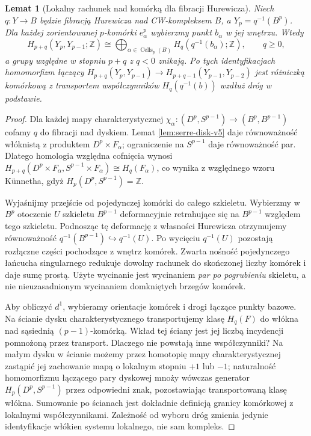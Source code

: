 \documentclass[11pt,a4paper,oneside]{report}
\newcommand{\Z}{\mathbb{Z}}
\theoremstyle{plain}
\newtheorem{lemat}[twierdzenie]{Lemat}
\theoremstyle{definition}
\theoremstyle{remark}
\begin{document}
\begin{lemat}[Lokalny rachunek nad komórką dla fibracji Hurewicza]
\label{lem:serre-cell-hurewicz-v6}
Niech $q:Y\to B$ będzie fibracją Hurewicza nad CW-kompleksem
$B$, a $Y_p=q^{-1}(B^p)$. Dla każdej zorientowanej
$p$-komórki $e^p_\alpha$ wybierzmy punkt $b_\alpha$ w jej
wnętrzu. Wtedy
\[
H_{p+q}(Y_p,Y_{p-1};\Z)\cong
\bigoplus_{\alpha\in\operatorname{Cells}_p(B)}
H_q(q^{-1}(b_\alpha);\Z),\qquad q\ge0,
\]
a grupy względne w stopniu $p+q$ z $q<0$ znikają.
Po tych identyfikacjach homomorfizm łączący
$H_{p+q}(Y_p,Y_{p-1})\to H_{p+q-1}(Y_{p-1},Y_{p-2})$
jest różniczką komórkową z transportem współczynników
$H_q(q^{-1}(b))$ wzdłuż dróg w podstawie.
\end{lemat}
\begin{proof}
Dla każdej mapy charakterystycznej
$\chi_\alpha:(D^p,S^{p-1})\to(B^p,B^{p-1})$
cofamy $q$ do fibracji nad dyskiem. Lemat
\ref{lem:serre-disk-v5} daje równoważność włóknistą
z produktem $D^p\times F_\alpha$; ograniczenie na
$S^{p-1}$ daje równoważność par. Dlatego homologia
względna cofnięcia wynosi
$H_{p+q}(D^p\times F_\alpha,S^{p-1}\times F_\alpha)
\cong H_q(F_\alpha)$, co wynika z względnego wzoru
Künnetha, gdyż $H_p(D^p,S^{p-1})=\Z$.

Wyjaśnijmy przejście od pojedynczej komórki do całego
szkieletu. Wybierzmy w $B^p$ otoczenie $U$ szkieletu
$B^{p-1}$ deformacyjnie retrahujące się na $B^{p-1}$
względem tego szkieletu. Podnosząc tę deformację
z własności Hurewicza otrzymujemy równoważność
$q^{-1}(B^{p-1})\hookrightarrow q^{-1}(U)$.
Po wycięciu $q^{-1}(U)$ pozostają rozłączne części
pochodzące z wnętrz komórek. Zwarta nośność pojedynczego
łańcucha singularnego redukuje dowolny rachunek do
skończonej liczby komórek i daje sumę prostą.
Użyte wycinanie jest wycinaniem \emph{par po pogrubieniu}
skieletu, a nie nieuzasadnionym wycinaniem domkniętych
brzegów komórek.

Aby obliczyć $d^1$, wybieramy orientacje komórek i drogi
łączące punkty bazowe. Na ścianie dysku
charakterystycznego transportujemy klasę $H_q(F)$ do
włókna nad sąsiednią $(p-1)$-komórką. Wkład tej ściany
jest jej liczbą incydencji pomnożoną przez transport.
Dlaczego nie powstają inne współczynniki?
Na małym dysku w ścianie możemy przez homotopię mapy
charakterystycznej zastąpić jej zachowanie mapą o lokalnym
stopniu $+1$ lub $-1$; naturalność homomorfizmu
łączącego pary dyskowej mnoży wówczas generator
$H_p(D^p,S^{p-1})$ przez odpowiedni znak, pozostawiając
transportowaną klasę włókna. Sumowanie po ścianach
jest dokładnie definicją granicy komórkowej z lokalnymi
współczynnikami. Zależność od wyboru dróg zmienia
jedynie identyfikacje włókien systemu lokalnego,
nie sam kompleks.
\end{proof}
\end{document}
